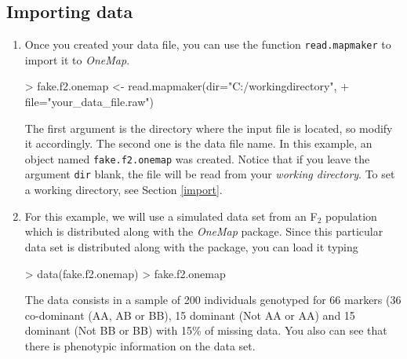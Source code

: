 \documentclass[letterpaper,12pt,oneside]{article}
\begin{document}
\subsection{Importing data}

\begin{enumerate}

\item Once you created your data file, you can use the function {\tt read.mapmaker} to import it to {\sl OneMap}.
  
\begin{Schunk}
\begin{Sinput}
> fake.f2.onemap <- read.mapmaker(dir="C:/workingdirectory", 
+                                 file="your_data_file.raw")
\end{Sinput}
\end{Schunk}

The first argument is the directory where the input file is located, so modify it accordingly.  The second one is the data file name. In this example, an object named {\tt fake.f2.onemap} was created. Notice that if you leave the argument {\tt dir} blank, the file will be read from your {\it working directory}. To set a working directory, see Section \ref{import}.

\item For this example, we will use a simulated data set from an F$_2$ population which is distributed along with the {\sl OneMap} package. Since this particular data set is distributed along with the package, you can load it typing
  
\begin{Schunk}
\begin{Sinput}
> data(fake.f2.onemap)
> fake.f2.onemap
\end{Sinput}
\end{Schunk}

The data consists in a sample of 200 individuals genotyped for 66 markers (36 co-dominant (AA, AB or BB), 15 dominant (Not AA or AA) and 15 dominant (Not BB or BB) with 15\% of missing data. You also can see that there is phenotypic information on the data set.

\end{enumerate}
\end{document}
